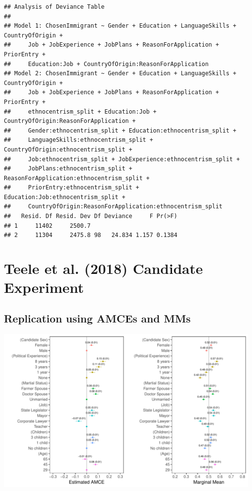 \documentclass[a4paper,12pt]{article}\usepackage[]{graphicx}\usepackage[]{color}
\makeatletter
\def\maxwidth{ %
  \ifdim\Gin@nat@width>\linewidth
    \linewidth
  \else
    \Gin@nat@width
  \fi
}
\newenvironment{kframe}{%
 \def\at@end@of@kframe{}%
 \ifinner\ifhmode%
  \def\at@end@of@kframe{\end{minipage}}%
  \begin{minipage}{\columnwidth}%
 \fi\fi%
 \def\FrameCommand##1{\hskip\@totalleftmargin \hskip-\fboxsep
 \colorbox{shadecolor}{##1}\hskip-\fboxsep
     \hskip-\linewidth \hskip-\@totalleftmargin \hskip\columnwidth}%
 \MakeFramed {\advance\hsize-\width
   \@totalleftmargin\z@ \linewidth\hsize
   \@setminipage}}%
 {\par\unskip\endMakeFramed%
 \at@end@of@kframe}
\newenvironment{knitrout}{}{} %
\makeatother
\begin{document}
\begin{knitrout}
\color{fgcolor}\begin{kframe}
\begin{verbatim}
## Analysis of Deviance Table
## 
## Model 1: ChosenImmigrant ~ Gender + Education + LanguageSkills + CountryOfOrigin + 
##     Job + JobExperience + JobPlans + ReasonForApplication + PriorEntry + 
##     Education:Job + CountryOfOrigin:ReasonForApplication
## Model 2: ChosenImmigrant ~ Gender + Education + LanguageSkills + CountryOfOrigin + 
##     Job + JobExperience + JobPlans + ReasonForApplication + PriorEntry + 
##     ethnocentrism_split + Education:Job + CountryOfOrigin:ReasonForApplication + 
##     Gender:ethnocentrism_split + Education:ethnocentrism_split + 
##     LanguageSkills:ethnocentrism_split + CountryOfOrigin:ethnocentrism_split + 
##     Job:ethnocentrism_split + JobExperience:ethnocentrism_split + 
##     JobPlans:ethnocentrism_split + ReasonForApplication:ethnocentrism_split + 
##     PriorEntry:ethnocentrism_split + Education:Job:ethnocentrism_split + 
##     CountryOfOrigin:ReasonForApplication:ethnocentrism_split
##   Resid. Df Resid. Dev Df Deviance     F Pr(>F)
## 1     11402     2500.7                         
## 2     11304     2475.8 98   24.834 1.157 0.1384
\end{verbatim}
\end{kframe}
\end{knitrout}

\clearpage


\section{Teele et al. (2018) Candidate Experiment}\label{app:tkr}

\subsection{Replication using AMCEs and MMs}

\begin{knitrout}
\color{fgcolor}
\includegraphics[width=\maxwidth]{figure/tkr_amce_appendix-1} 

\end{knitrout}
\end{document}
